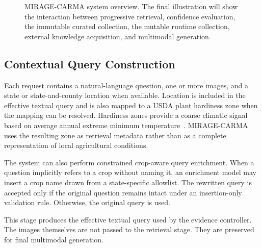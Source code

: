 \documentclass[runningheads]{llncs}
\begin{document}
\begin{figure}[t]
    \centering



    \caption{MIRAGE-CARMA system overview. The final illustration will show the
    interaction between progressive retrieval, confidence evaluation, the
    immutable curated collection, the mutable runtime collection, external
    knowledge acquisition, and multimodal generation.}
    \label{fig:architecture}
\end{figure}

\subsection{Contextual Query Construction}

Each request contains a natural-language question, one or more images, and a state or state-and-county location when available. Location is included in the effective textual query and is also mapped to a USDA plant hardiness zone when the mapping can be resolved. Hardiness zones provide a coarse climatic signal based on average annual extreme minimum temperature~\cite{usda2023phzm}. MIRAGE-CARMA uses the resulting zone as retrieval metadata rather than as a complete representation of local agricultural conditions.

The system can also perform constrained crop-aware query enrichment. When a question implicitly refers to a crop without naming it, an enrichment model may insert a crop name drawn from a state-specific allowlist. The rewritten query is accepted only if the original question remains intact under an insertion-only validation rule. Otherwise, the original query is used.

This stage produces the effective textual query used by the evidence controller. The images themselves are not passed to the retrieval stage. They are preserved for final multimodal generation.
\end{document}
